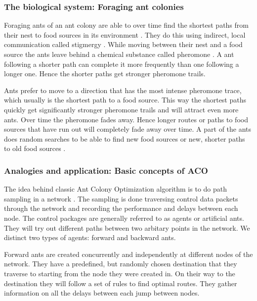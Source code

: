 \documentclass{IWORK2014}
\begin{document}
\subsubsection{The biological system: Foraging ant colonies}
Foraging ants of an ant colony are able to over time find the shortest paths from their nest to food sources in its environment \cite{dorigo1999ant, goss1989self}. They do this using indirect, local communication called stigmergy \cite{grasse1959reconstruction}. While moving between their nest and a food source the ants leave behind a chemical substance called pheromone \cite{ghosh2008aggregation}. A ant following a shorter path can complete it more frequently than one following a longer one. Hence the shorter paths get stronger pheromone trails.

Ants prefer to move to a direction that has the most intense pheromone trace, which usually is the shortest path to a food source. This way the shortest paths quickly get significantly stronger pheromone trails and will attract even more ants. Over time the pheromone fades away. Hence longer routes or paths to food sources that have run out will completely fade away over time. A part of the ants does random searches to be able to find new food sources or new, shorter paths to old food sources \cite{dressler2010bio}.

\subsubsection{Analogies and application: Basic concepts of ACO}
The idea behind classic Ant Colony Optimization algorithm is to do path sampling in a network \cite{di2004ant, di2008theory}. The sampling is done traversing control data packets through the network and recording the performance and delays between each node. The control packages are generally referred to as agents or artificial ants. They will try out different paths between two arbitary points in the network. We distinct two types of agents: forward and backward ants.

Forward ants are created concurrently and independently at different nodes of the network. They have a predefined, but randomly chosen destination that they traverse to starting from the node they were created in. On their way to the destination they will follow a set of rules to find optimal routes. They gather information on all the delays between each jump between nodes.
\end{document}
